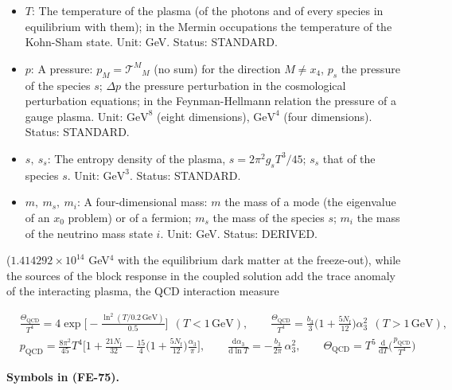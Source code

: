 \documentclass[
  10pt,
]{article}
\begin{document}
\begin{itemize}
  Value: 2.718281828. Status: STANDARD.
\item
  \(T\): The temperature of the plasma (of the photons and of every
  species in equilibrium with them); in the Mermin occupations the
  temperature of the Kohn-Sham state. Unit: GeV. Status: STANDARD.
\item
  \(p\): A pressure: \(p_M = \mathcal{T}^M{}_M\) (no sum) for the
  direction \(M \ne x_4\), \(p_s\) the pressure of the species \(s\);
  \(\Delta p\) the pressure perturbation in the cosmological
  perturbation equations; in the Feynman-Hellmann relation the pressure
  of a gauge plasma. Unit: \(\mathrm{GeV}^{8}\) (eight dimensions),
  \(\mathrm{GeV}^{4}\) (four dimensions). Status: STANDARD.
\item
  \(s,\ s_s\): The entropy density of the plasma,
  \(s = 2\pi^2g_sT^3/45\); \(s_s\) that of the species \(s\). Unit:
  \(\mathrm{GeV}^{3}\). Status: STANDARD.
\item
  \(m,\ m_s,\ m_i\): A four-dimensional mass: \(m\) the mass of a mode
  (the eigenvalue of an \(x_0\) problem) or of a fermion; \(m_s\) the
  mass of the species \(s\); \(m_i\) the mass of the neutrino mass state
  \(i\). Unit: GeV. Status: DERIVED.
\end{itemize}

(\(1.414292\times10^{14}\) GeV\(^4\) with the equilibrium dark matter at
the freeze-out), while the sources of the block response in the coupled
solution add the trace anomaly of the interacting plasma, the QCD
interaction measure

\[
\begin{aligned}
&\frac{\Theta_{\mathrm{QCD}}}{T^4} = 4\exp\Big[-\frac{\ln^2(T/0.2\,\text{GeV})}{0.5}\Big]\ \ (T <
 1\,\text{GeV}),\qquad
 \frac{\Theta_{\mathrm{QCD}}}{T^4} = \frac{b_3}{3}\Big(1 +
 \frac{5N_{\mathrm{f}}}{12}\Big)\alpha_3^2\ \ (T > 1\,\text{GeV}),\\
&p_{\mathrm{QCD}} = \frac{8\pi^2}{45}T^4\Big[1 + \frac{21N_{\mathrm{f}}}{32}
 - \frac{15}{4}\Big(1 + \frac{5N_{\mathrm{f}}}{12}\Big)\frac{\alpha_3}{\pi}\Big],\qquad
 \frac{\mathrm{d}\alpha_3}{\mathrm{d}\ln T} = -\frac{b_3}{2\pi}\,\alpha_3^2,\qquad
 \Theta_{\mathrm{QCD}} = T^5\,\frac{\mathrm{d}}{\mathrm{d}T}\Big(\frac{p_{\mathrm{QCD}}}{T^4}\Big)
\end{aligned} \tag{FE-75}
\]

\textbf{Symbols in (FE-75).}
\end{document}
